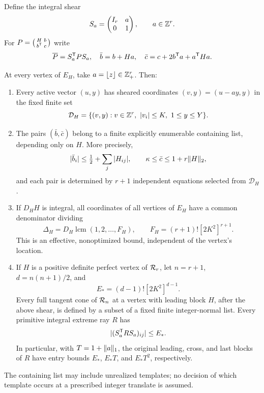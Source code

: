 Define the integral shear
\[
 S_a=\begin{pmatrix}I_r&a\\0&1\end{pmatrix},\qquad a\in\mathbb Z^r.
\]
For $P=\left(\begin{smallmatrix}H&b\\b^{\mathsf T}&c\end{smallmatrix}\right)$ write
\[
 \overline P=S_a^{\mathsf T} PS_a,
 \quad\bar b=b+Ha,\quad\bar c=c+2b^{\mathsf T} a+a^{\mathsf T} Ha.
\]

\begin{theorem}\label{thm:templates}
At every vertex of $E_H$, take $a=\lfloor z\rfloor\in\mathbb Z_+^r$. Then:
\begin{enumerate}
\item Every active vector $(u,y)$ has sheared coordinates $(v,y)=(u-ay,y)$ in the fixed finite set
\[
 \mathcal D_H=\{(v,y):v\in\mathbb Z^r,\ |v_i|\le K,\ 1\le y\le Y\}.
\]
\item The pairs $(\bar b,\bar c)$ belong to a finite explicitly enumerable containing list, depending only on $H$. More precisely,
\[
 |\bar b_i|\le\tfrac12+\sum_j|H_{ij}|,\qquad
 \kappa\le\bar c\le1+r\lVert H\rVert_2,
\]
and each pair is determined by $r+1$ independent equations selected from $\mathcal D_H$.
\item If $D_HH$ is integral, all coordinates of all vertices of $E_H$ have a common denominator dividing
\[
 \Delta_H=D_H\operatorname{lcm}(1,2,\ldots,F_H),\qquad
 F_H=(r+1)![2K^2]^{r+1}.
\]
This is an effective, nonoptimized bound, independent of the vertex's location.
\item If $H$ is a positive definite perfect vertex of $\mathcal R_r$, let $n=r+1$, $d=n(n+1)/2$, and
\[
 E_*=(d-1)![2K^2]^{d-1}.
\]
Every full tangent cone of $\mathcal R_n$ at a vertex with leading block $H$, after the above shear, is defined by a subset of a fixed finite integer-normal list. Every primitive integral extreme ray $R$ has
\begin{equation}\label{eq:shearedrays}
 |(S_a^{\mathsf T} RS_a)_{ij}|\le E_*.
\end{equation}
In particular, with $T=1+\lVert a\rVert_1$, the original leading, cross, and last blocks of $R$ have entry bounds $E_*$, $E_*T$, and $E_*T^2$, respectively.
\end{enumerate}
The containing list may include unrealized templates; no decision of which template occurs at a prescribed integer translate is assumed.
\end{theorem}
